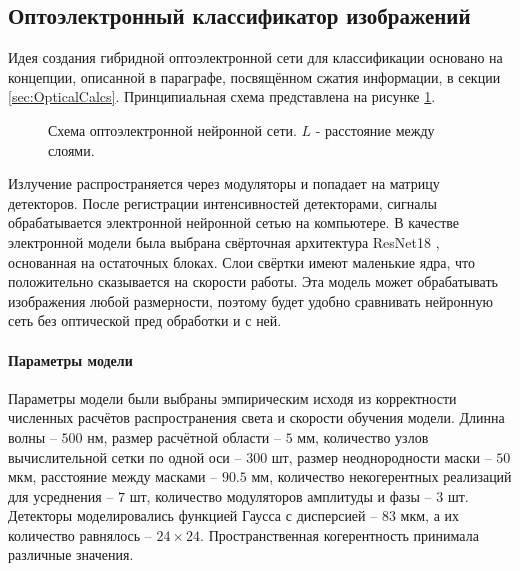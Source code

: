 \subsection{Оптоэлектронный классификатор изображений}
Идея создания гибридной оптоэлектронной сети для классификации основано на концепции, описанной в параграфе, посвящённом сжатия информации, в секции \ref{sec:OpticalCalcs}. Принципиальная схема представлена на рисунке \ref{ris:OEScheme}.
\begin{figure}[htbp]
	\caption{Схема оптоэлектронной нейронной сети. $L$ - расстояние между слоями.}
	\label{ris:OEScheme}
\end{figure}
Излучение распространяется через модуляторы и попадает на матрицу детекторов. После регистрации интенсивностей детекторами, сигналы обрабатывается электронной нейронной сетью на компьютере. В качестве электронной модели была выбрана свёрточная архитектура ResNet18 \cite{he2016deep}, основанная на остаточных блоках. Слои свёртки  имеют маленькие ядра, что положительно сказывается на скорости работы. Эта модель может обрабатывать изображения любой размерности, поэтому будет удобно сравнивать нейронную сеть без оптической пред обработки и с ней.

\paragraph{Параметры модели}
Параметры модели были выбраны эмпирическим исходя из корректности численных расчётов распространения света и скорости обучения модели. Длинна волны -- $500$ нм, размер расчётной области -- $5$ мм, количество узлов вычислительной сетки по одной оси -- $300$ шт, размер неоднородности маски -- $50$ мкм, расстояние между масками -- $90.5$ мм, количество некогерентных реализаций для усреднения -- $7$ шт, количество модуляторов амплитуды и фазы -- $3$ шт. Детекторы моделировались функцией Гаусса с дисперсией -- $83$ мкм, а их количество равнялось -- $24 \times 24$. Пространственная когерентность принимала различные значения.

